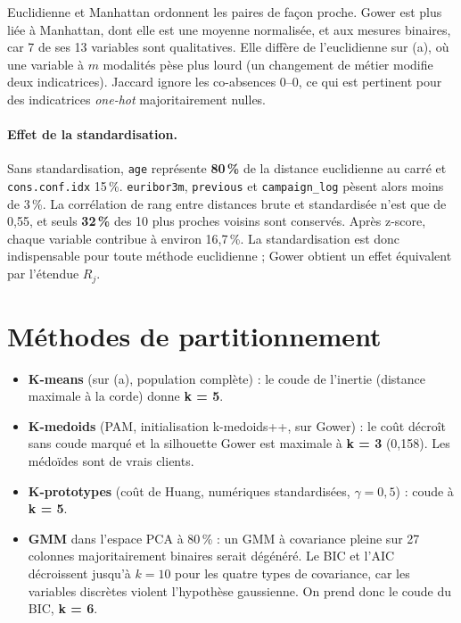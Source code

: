 \documentclass[11pt,a4paper]{article}
\begin{document}
Euclidienne et Manhattan ordonnent les paires de façon proche. Gower est plus liée à Manhattan, dont elle est une moyenne normalisée, et aux mesures binaires, car 7 de ses 13 variables sont qualitatives. Elle diffère de l'euclidienne sur (a), où une variable à $m$ modalités pèse plus lourd (un changement de métier modifie deux indicatrices). Jaccard ignore les co-absences 0–0, ce qui est pertinent pour des indicatrices \emph{one-hot} majoritairement nulles.

\paragraph{Effet de la standardisation.} Sans standardisation, \texttt{age} représente \textbf{80\,\%} de la distance euclidienne au carré et \texttt{cons.conf.idx} 15\,\%. \texttt{euribor3m}, \texttt{previous} et \texttt{campaign\_log} pèsent alors moins de 3\,\%. La corrélation de rang entre distances brute et standardisée n'est que de 0,55, et seuls \textbf{32\,\%} des 10 plus proches voisins sont conservés. Après z-score, chaque variable contribue à environ 16,7\,\%. La standardisation est donc indispensable pour toute méthode euclidienne ; Gower obtient un effet équivalent par l'étendue $R_j$.

\section{Méthodes de partitionnement}\label{sec:part}
\begin{itemize}
\item \textbf{K-means} (sur (a), population complète) : le coude de l'inertie (distance maximale à la corde) donne \textbf{k = 5}.
\item \textbf{K-medoids} (PAM, initialisation k-medoids++, sur Gower) : le coût décroît sans coude marqué et la silhouette Gower est maximale à \textbf{k = 3} (0,158). Les médoïdes sont de vrais clients.
\item \textbf{K-prototypes} (coût de Huang, numériques standardisées, $\gamma = 0{,}5$) : coude à \textbf{k = 5}.
\item \textbf{GMM} dans l'espace PCA à 80\,\% : un GMM à covariance pleine sur 27 colonnes majoritairement binaires serait dégénéré. Le BIC et l'AIC décroissent jusqu'à $k=10$ pour les quatre types de covariance, car les variables discrètes violent l'hypothèse gaussienne. On prend donc le coude du BIC, \textbf{k = 6}.
\end{itemize}
\end{document}
